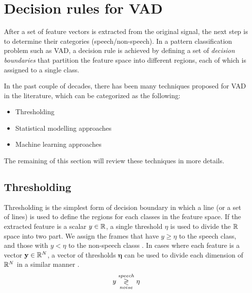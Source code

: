 \section{Decision rules for VAD}
After a set of feature vectors is extracted from the original signal, the next step is to determine their categories (speech/non-speech). In a pattern classification problem such as VAD, a decision rule is achieved by defining a set of \emph{decision boundaries} that partition the feature space into different regions, each of which is assigned to a single class.

In the past couple of decades, there has been many techniques proposed for VAD in the literature, which can be categorized as the following:

\begin{itemize}\addtolength{\itemsep}{-0.5\baselineskip}
	\item Thresholding
	\item Statistical modelling approaches
	\item Machine learning approaches
\end{itemize}

The remaining of this section will review these techniques in more details.

\subsection{Thresholding}
Thresholding is the simplest form of decision boundary in which a line (or a set of lines) is used to define the regions for each classes in the feature space. If the extracted feature is a scalar $y \in \mathbb{R}$, a single threshold $\eta$ is used to divide the $\mathbb{R}$ space into two part. We assign the frames that have $y\ge\eta$ to the speech class, and those with $y<\eta$ to the non-speech classs \cite{haigh1993robust,ghosh2011robust}. In cases where each feature is a vector $\mathbf{y}\in\mathbb{R}^N$, a vector of thresholds $\boldsymbol{\eta}$ can be used to divide each dimension of $\mathbb{R}^N$ in a similar manner \cite{sohn1998voice,ramirez2004efficient,woo2000robust}.
\begin{equation}
    y \overset{speech}{\underset{noise}{\gtrless}} \eta
\end{equation}

